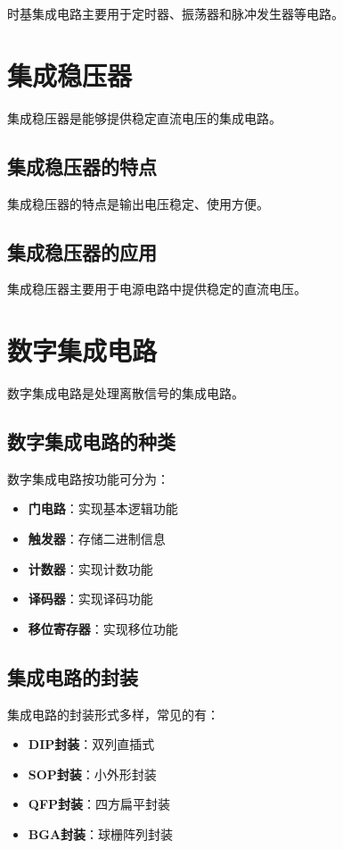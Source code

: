 \documentclass[12pt,UTF8]{ctexbook}
\begin{document}
时基集成电路主要用于定时器、振荡器和脉冲发生器等电路。

\section{集成稳压器}

集成稳压器是能够提供稳定直流电压的集成电路。

\subsection{集成稳压器的特点}

集成稳压器的特点是输出电压稳定、使用方便。

\subsection{集成稳压器的应用}

集成稳压器主要用于电源电路中提供稳定的直流电压。

\section{数字集成电路}

数字集成电路是处理离散信号的集成电路。

\subsection{数字集成电路的种类}

数字集成电路按功能可分为：

\begin{itemize}[leftmargin=2cm]
	\item \textbf{门电路}：实现基本逻辑功能
	\item \textbf{触发器}：存储二进制信息
	\item \textbf{计数器}：实现计数功能
	\item \textbf{译码器}：实现译码功能
	\item \textbf{移位寄存器}：实现移位功能
\end{itemize}

\subsection{集成电路的封装}

集成电路的封装形式多样，常见的有：

\begin{itemize}[leftmargin=2cm]
	\item \textbf{DIP封装}：双列直插式
	\item \textbf{SOP封装}：小外形封装
	\item \textbf{QFP封装}：四方扁平封装
	\item \textbf{BGA封装}：球栅阵列封装
\end{itemize}
\end{document}
